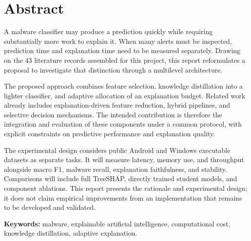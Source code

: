 \chapter*{Abstract}
A malware classifier may produce a prediction quickly while requiring substantially more work to explain it. When many alerts must be inspected, prediction time and explanation time need to be measured separately. Drawing on the 43 literature records assembled for this project, this report reformulates a proposal to investigate that distinction through a multilevel architecture.

The proposed approach combines feature selection, knowledge distillation into a lighter classifier, and adaptive allocation of an explanation budget. Related work already includes explanation-driven feature reduction, hybrid pipelines, and selective decision mechanisms. The intended contribution is therefore the integration and evaluation of these components under a common protocol, with explicit constraints on predictive performance and explanation quality.

The experimental design considers public Android and Windows executable datasets as separate tasks. It will measure latency, memory use, and throughput alongside macro F1, malware recall, explanation faithfulness, and stability. Comparisons will include full TreeSHAP, directly trained student models, and component ablations. This report presents the rationale and experimental design; it does not claim empirical improvements from an implementation that remains to be developed and validated.

\noindent\textbf{Keywords:} malware, explainable artificial intelligence, computational cost, knowledge distillation, adaptive explanation.
